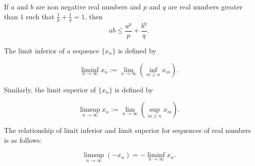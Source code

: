 \begin{theorem}\label{thm::YoungInequality}
    If $a$ and $b$ are non negative real numbers and $p$ and $q$ are real numbers greater than $1$ such that 
    $\frac{1}{p} + \frac{1}{q} = 1$, then
    \begin{equation*}
        ab\leq \frac{a^p}{p} + \frac{b^q}{q}.
    \end{equation*}
\end{theorem}
The limit inferior of a sequence $\{x_n\}$ is defined by

\begin{equation}\label{eqn::limitInf}
    \liminf_{n\to \infty}x_n :=\lim_{n \to \infty}\left(\inf_{m\geq n}x_m\right).
\end{equation}

Similarly, the limit superior of $\{x_n\}$ is defined by 

\begin{equation}\label{eqn::limitSup}
    \limsup_{n\to \infty}x_n :=\lim_{n \to \infty}\left(\sup_{m\geq n}x_m\right).
\end{equation}

The relationship of limit inferior and limit superior for sequences of real numbers is as follows:

\begin{equation}\label{eqn::propertybetween}
   \limsup_{n \to \infty} (-x_n) = -\liminf_{n \to \infty} x_n.
\end{equation}
